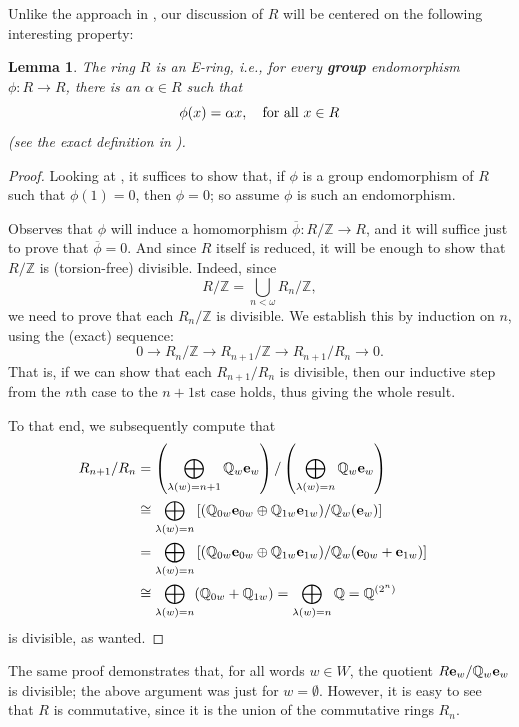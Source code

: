 \documentclass[12pt]{amsart}
\newtheorem{lemma}[theorem]{Lemma}
\theoremstyle{definition}
\def\bbv#1{{\bf #1}}
\def\Z{{\mathbb Z}}
\def\Q{{\mathbb Q}}
\begin{document}
\medskip

Unlike the approach in \cite {AR}, our discussion of $R$ will be centered on the following interesting property:

\begin{lemma} The ring $R$ is an E-ring, i.e., for every {\bf group} endomorphism $\phi:R\to R$, there is an $\alpha \in R$ such that
$$
                     \phi(x)=\alpha x, \ \ \ {\rm for\ all\ }x\in R
$$
(see the exact definition in \cite [Section~18.6]{F}).
\end{lemma}

\begin{proof} Looking at \cite[Theorem~18.6.3(ii)]{F}, it suffices to show that, if $\phi$ is a group endomorphism of $R$ such that $\phi(1)=0$, then $\phi=0$; so assume $\phi$ is such an endomorphism.

Observes that $\phi$ will induce a homomorphism $\overline \phi: R/\Z\to R$, and it will suffice just to prove that $\overline \phi=0$. And since $R$ itself is reduced, it will be enough to show that $R/\Z$ is (torsion-free) divisible. Indeed, since
$$
                     R/\Z= \bigcup_{n<\omega} R_n/\Z,
$$
we need to prove that each $R_n/\Z$ is divisible. We establish this by induction on $n$, using the (exact) sequence:
$$
          0 \to R_n/\Z\to R_{n+1}/\Z\to R_{n+1}/R_n \to 0.
$$
That is, if we can show that each $R_{n+1}/R_n$ is divisible, then our inductive step from the $n$th case to the $n+1$st case holds, thus giving the whole result.

\medskip

To that end, we subsequently compute that
\begin{align*}
       R_{n+1}/R_n&=\left(\bigoplus_{ {\lambda(w)=n+1}} \Q_w\bbv e_w\right)/ \left(\bigoplus_{\lambda(w)=n} \Q_w\bbv e_w\right)\cr
                  &  \cong \bigoplus_{ {\lambda(w)=n}} \left[ (\Q_{0w}\bbv e_{{0w}}\oplus\Q_{1w}\bbv e_{{1w}})/ \Q_w(\bbv e_w)\right]\cr
                  &  =\bigoplus_{ {\lambda(w)=n}}  \left[(\Q_{0w}\bbv e_{{0w}}\oplus\Q_{1w}\bbv e_{{1w}})/ \Q_w(\bbv e_{0w}+\bbv e_{1w})\right]\cr
                  &  \cong \bigoplus_{{\lambda(w)=n}} (\Q_{0w}+\Q_{1w})= \bigoplus_{{\lambda(w)=n}} \Q= \Q^{(2^n)}\cr
\end{align*}
is divisible, as wanted.
\end{proof}

The same proof demonstrates that, for all words $w\in W$, the quotient $R \bbv e_w/\Q_w \bbv e_w$ is divisible; the above argument was just for $w=\emptyset$. However, it is easy to see that $R$ is commutative, since it is the union of the commutative rings $R_n$.
\end{document}
